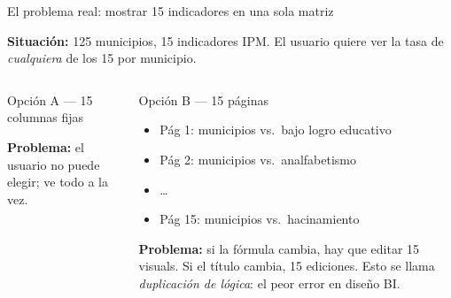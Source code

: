 \documentclass[aspectratio=169,10pt]{beamer}
\begin{document}
\begin{frame}{El problema real: mostrar 15 indicadores en una sola matriz}

\textbf{Situaci\'on:} 125 municipios, 15 indicadores IPM.
El usuario quiere ver la tasa de \emph{cualquiera} de los 15 por municipio.

\bigskip
\begin{columns}[T]

\begin{exampleblock}{Opci\'on A --- 15 columnas fijas}
\begin{center}
\end{center}
\textcolor{red!70!black}{\textbf{Problema:}} el usuario no puede elegir; ve todo a la vez.
\end{exampleblock}

\begin{alertblock}{Opci\'on B --- 15 p\'aginas}
\begin{itemize}\footnotesize
  \item P\'ag 1: municipios vs.\ bajo logro educativo
  \item P\'ag 2: municipios vs.\ analfabetismo
  \item \ldots
  \item P\'ag 15: municipios vs.\ hacinamiento
\end{itemize}
\textcolor{red!70!black}{\textbf{Problema:}} si la f\'ormula cambia,
hay que editar 15 visuals.
Si el t\'itulo cambia, 15 ediciones.
Esto se llama \emph{duplicaci\'on de l\'ogica}: el peor error en dise\~no BI.
\end{alertblock}

\end{columns}

\end{frame}
\end{document}
